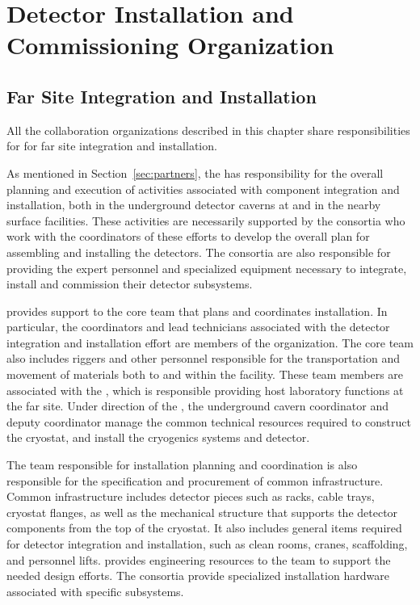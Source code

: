 \chapter{Detector Installation and Commissioning Organization}
\label{vl:tc-jpo}


\section{Far Site Integration and Installation}
\label{sec:far_site}

All the collaboration organizations described in this chapter share
responsibilities for for far site integration and installation.
 
As mentioned in Section~\ref{sec:partners}, the  
has responsibility for the overall planning and execution of
activities associated with component integration and installation,
both in the underground detector caverns at  and in the
nearby surface facilities.  These activities are necessarily supported
by the  consortia who work with the  coordinators of these
efforts to develop the overall plan for assembling and installing the
detectors.  The consortia are also responsible for providing the
expert personnel and specialized equipment necessary to integrate,
install and commission their detector subsystems.

  provides support to the  core team
that plans and coordinates installation.  In particular, the
coordinators and lead technicians associated with the detector
integration and installation effort are members of the 
organization.  The core team also includes riggers and other personnel
responsible for the transportation and movement of materials both to
and within the  facility.  These team members are
associated with the  , which is responsible
providing host laboratory functions at the far site. Under direction
of the , the underground cavern coordinator and deputy
coordinator manage the common technical resources required to
construct the cryostat, and install the cryogenics systems and
detector.


The  team responsible for installation planning and
coordination is also responsible for the specification and procurement
of common infrastructure.  Common infrastructure includes detector
pieces such as racks, cable trays, cryostat flanges, as well as the
mechanical structure that supports the detector components from the
top of the cryostat.  It also includes general items required for
detector integration and installation, such as clean rooms, cranes,
scaffolding, and personnel lifts.   provides
engineering resources to the  team to support the needed
design efforts. The consortia provide specialized installation
hardware associated with specific subsystems.


